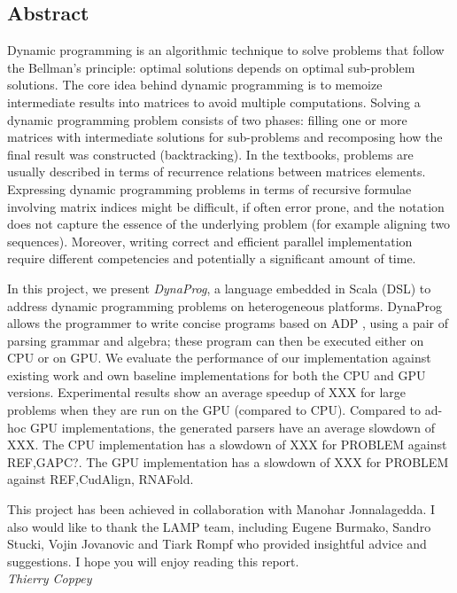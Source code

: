 \subsection*{Abstract}
Dynamic programming is an algorithmic technique to solve problems that follow the Bellman's principle\cite{bellman_principle}: optimal solutions depends on optimal sub-problem solutions. The core idea behind dynamic programming is to memoize intermediate results into matrices to avoid multiple computations. Solving a dynamic programming problem consists of two phases: filling one or more matrices with intermediate solutions for sub-problems and recomposing how the final result was constructed (backtracking). In the textbooks, problems are usually described in terms of recurrence relations between matrices elements. Expressing dynamic programming problems in terms of recursive formulae involving matrix indices might be difficult, if often error prone, and the notation does not capture the essence of the underlying problem (for example aligning two sequences). Moreover, writing correct and efficient parallel implementation require different competencies and potentially a significant amount of time.

In this project, we present \textit{DynaProg}, a language embedded in Scala (DSL) to address dynamic programming problems on heterogeneous platforms. DynaProg allows the programmer to write concise programs based on ADP \cite{adp}, using a pair of parsing grammar and algebra; these program can then be executed either on CPU or on GPU. We evaluate the performance of our implementation against existing work and own baseline implementations for both the CPU and GPU versions. Experimental results show an average speedup of {\color{red} XXX} for large problems when they are run on the GPU (compared to CPU). Compared to ad-hoc GPU implementations, the generated parsers have an average slowdown of {\color{red} XXX}.
The CPU implementation has a slowdown of {\color{red} XXX} for {\color{red} PROBLEM} against {\color{red} REF,GAPC?}.
The GPU implementation has a slowdown of {\color{red} XXX} for {\color{red} PROBLEM} against {\color{red} REF,CudAlign, RNAFold}.


\vfill
This project has been achieved in collaboration with Manohar Jonnalagedda. I also would like to thank the LAMP team, including Eugene Burmako, Sandro Stucki, Vojin Jovanovic and Tiark Rompf who provided insightful advice and suggestions. I hope you will enjoy reading this report. \vspace{.3cm}\\
\textit{Thierry Coppey}

